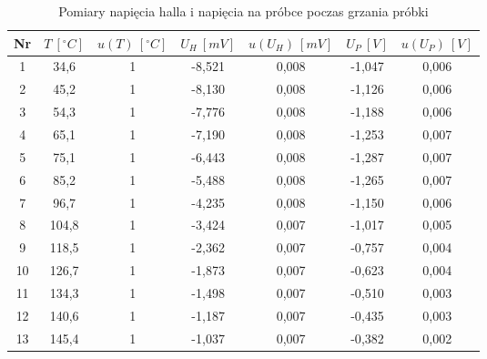\documentclass[12pt]{article}
\begin{document}
\begin{table}[H]
    \centering
    \begin{tabular}{c|cc|cc|cc}
        \toprule
        Nr & $T \ [^\circ C]$ & $u(T) \ [^\circ C]$ & $U_H \ [mV]$ & $u(U_H) \ [mV]$ & $U_P \ [V]$ & $u(U_P) \ [V]$ \\
        \midrule
        1  & 34{,}6  & 1 & -8{,}521 & 0{,}008 & -1{,}047 & 0{,}006 \\
        2  & 45{,}2  & 1 & -8{,}130 & 0{,}008 & -1{,}126 & 0{,}006 \\
        3  & 54{,}3  & 1 & -7{,}776 & 0{,}008 & -1{,}188 & 0{,}006 \\
        4  & 65{,}1  & 1 & -7{,}190 & 0{,}008 & -1{,}253 & 0{,}007 \\
        5  & 75{,}1  & 1 & -6{,}443 & 0{,}008 & -1{,}287 & 0{,}007 \\
        6  & 85{,}2  & 1 & -5{,}488 & 0{,}008 & -1{,}265 & 0{,}007 \\
        7  & 96{,}7  & 1 & -4{,}235 & 0{,}008 & -1{,}150 & 0{,}006 \\
        8  & 104{,}8 & 1 & -3{,}424 & 0{,}007 & -1{,}017 & 0{,}005 \\
        9  & 118{,}5 & 1 & -2{,}362 & 0{,}007 & -0{,}757 & 0{,}004 \\
        10 & 126{,}7 & 1 & -1{,}873 & 0{,}007 & -0{,}623 & 0{,}004 \\
        11 & 134{,}3 & 1 & -1{,}498 & 0{,}007 & -0{,}510 & 0{,}003 \\
        12 & 140{,}6 & 1 & -1{,}187 & 0{,}007 & -0{,}435 & 0{,}003 \\
        13 & 145{,}4 & 1 & -1{,}037 & 0{,}007 & -0{,}382 & 0{,}002 \\
        \bottomrule
    \end{tabular}
    \caption{Pomiary napięcia halla i napięcia na próbce poczas grzania próbki}
    \label{tab:heating_measurements}
\end{table}
\end{document}
